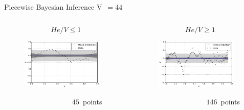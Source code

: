 \documentclass[10pt]{beamer}
\begin{document}
\begin{frame}{Piecewise Bayesian Inference V~$= 44$}
  	\begin{columns}[onlytextwith]
    	\begin{column}{0.5\textwidth}
    	$$He/V \leq 1$$
      		\begin{figure}
        		\includegraphics[width=0.9\textwidth]{low44ResultDiff}
      		\end{figure}
      		~~~~~~~~~~~~~~~~~~~$45$~points
    	\end{column}  
    	\begin{column}{0.5\textwidth}
    	$$He/V \geq 1$$
      		\begin{figure}
        		\includegraphics[width=0.9\textwidth]{high44ResultDiff}
      		\end{figure}
      		~~~~~~~~~~~~~~~~~~~$146$~points
    	\end{column}
  	\end{columns}
\end{frame}
\end{document}
